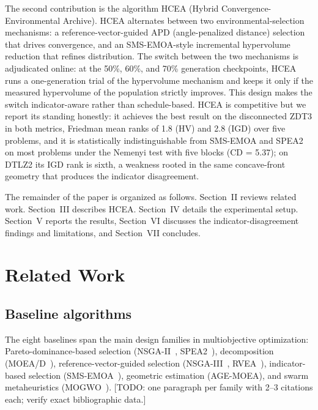 \documentclass[journal]{IEEEtran}
\begin{document}
The second contribution is the algorithm HCEA (Hybrid Convergence-Environmental Archive). HCEA alternates between two environmental-selection mechanisms: a reference-vector-guided APD (angle-penalized distance) selection that drives convergence, and an SMS-EMOA-style incremental hypervolume reduction that refines distribution. The switch between the two mechanisms is adjudicated online: at the 50\%, 60\%, and 70\% generation checkpoints, HCEA runs a one-generation trial of the hypervolume mechanism and keeps it only if the measured hypervolume of the population strictly improves. This design makes the switch indicator-aware rather than schedule-based. HCEA is competitive but we report its standing honestly: it achieves the best result on the disconnected ZDT3 in both metrics, Friedman mean ranks of 1.8 (HV) and 2.8 (IGD) over five problems, and it is statistically indistinguishable from SMS-EMOA and SPEA2 on most problems under the Nemenyi test with five blocks (CD = 5.37); on DTLZ2 its IGD rank is sixth, a weakness rooted in the same concave-front geometry that produces the indicator disagreement.

The remainder of the paper is organized as follows. Section~II reviews related work. Section~III describes HCEA. Section~IV details the experimental setup. Section~V reports the results, Section~VI discusses the indicator-disagreement findings and limitations, and Section~VII concludes.

\section{Related Work}
\subsection{Baseline algorithms}
The eight baselines span the main design families in multiobjective optimization: Pareto-dominance-based selection (NSGA-II~\cite{deb2002nsga2}, SPEA2~\cite{zitzler2001spea2}), decomposition (MOEA/D~\cite{zhang2007moead}), reference-vector-guided selection (NSGA-III~\cite{deb2014nsga3}, RVEA~\cite{cheng2016rvea}), indicator-based selection (SMS-EMOA~\cite{beume2007smsemoa}), geometric estimation (AGE-MOEA), and swarm metaheuristics (MOGWO~\cite{mirjalili2016mogwo}). [TODO: one paragraph per family with 2--3 citations each; verify exact bibliographic data.]
\end{document}
